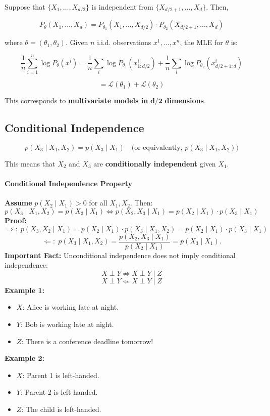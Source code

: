 \documentclass{article}%
\begin{document}
Suppose that $\{ X_1, \dots, X_{d/2} \}$ is independent from $\{ X_{d/2+1}, \dots, X_d \}$. Then,

\[
P_{\theta}(X_1, \dots, X_d) = P_{\theta_1}(X_1, \dots, X_{d/2}) \cdot P_{\theta_2}(X_{d/2+1}, \dots, X_d)
\]

where $\theta = (\theta_1, \theta_2)$.
Given $n$ i.i.d. observations $x^1, \dots, x^n$, the MLE for $\theta$ is:

\[
\frac{1}{n} \sum_{i=1}^{n} \log P_{\theta}(x^i) = \frac{1}{n} \sum_{i} \log P_{\theta_1}(x^i_{1:d/2}) + \frac{1}{n} \sum_{i} \log P_{\theta_2}(x^i_{d/2+1:d})
\]

\[
= \mathcal{L}(\theta_1) + \mathcal{L}(\theta_2)
\]

This corresponds to \textbf{multivariate models in} $\mathbf{d/2}$ \textbf{dimensions}.



\subsection{Conditional Independence}

\[
p(X_3 \mid X_1, X_2) = p(X_3 \mid X_1) \quad \text{(or equivalently, } p(X_3 \mid X_1, X_2) \text{)}
\]

This means that \( X_2 \) and \( X_3 \) are \textbf{conditionally independent} given \( X_1 \).

\paragraph{Conditional Independence Property}
\textbf{Assume} \( p(X_2 \mid X_1) > 0 \) for all \( X_1, X_2 \). Then:
\[
p(X_3 \mid X_1, X_2) = p(X_3 \mid X_1) \iff p(X_2, X_3 \mid X_1) = p(X_2 \mid X_1) \cdot p(X_3 \mid X_1)
\]
\textbf{Proof:}
\[
\Rightarrow \text{:}\ \  p(X_3, X_2 \mid X_1) = p(X_2 \mid X_1) \cdot p(X_3 \mid X_1, X_2)
= p(X_2 \mid X_1) \cdot p(X_3 \mid X_1)
\]
\[
\Leftarrow \text{:}\ \  p(X_3 \mid X_1, X_2) = \frac{p(X_2, X_3 \mid X_1)}{p(X_2 \mid X_1)} = p(X_3 \mid X_1).
\]
\textbf{Important Fact:} Unconditional independence does not imply conditional independence:
\[
X \perp Y \not\Rightarrow X \perp Y \mid Z
\]
\[
X \perp Y \not\Leftarrow X \perp Y \mid Z
\]
\textbf{Example 1:}
\begin{itemize}
    \item \( X \): Alice is working late at night.
    \item \( Y \): Bob is working late at night.
    \item \( Z \): There is a conference deadline tomorrow!
\end{itemize}
\textbf{Example 2:}
\begin{itemize}
    \item \( X \): Parent 1 is left-handed.
    \item \( Y \): Parent 2 is left-handed.
    \item \( Z \): The child is left-handed.
\end{itemize}
\end{document}
